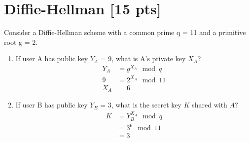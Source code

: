 \documentclass[11pt]{article}
\begin{document}
\section{Diffie-Hellman [15 pts]}
Consider a Diffie-Hellman scheme with a common prime q = 11 and a primitive root g = 2.
\begin{enumerate}
\item  If user A has public key $Y_A$ = 9, what is A's private key $X_A$?
\begin{align*}
  Y_{A} &= g^{X_{A}}\mod q \\
  9 &= 2^{X_{A}}\mod 11 \\
  X_{A} &= 6
\end{align*}
\item If user B has public key $Y_B$ = 3, what is the secret key $K$ shared with $A$?
\begin{align*}
  K &= Y_{B}^{X_{A}}\mod q \\
  &= 3^{6}\mod 11 \\
  &= 3
\end{align*}
\end{enumerate}

\medskip
\end{document}
